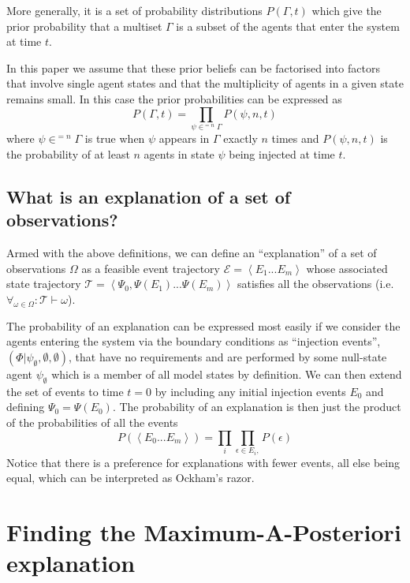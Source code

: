 \documentclass{article}
\begin{document}
More generally, it is a set of probability distributions $P(\Gamma,t)$ which give the prior probability that a multiset $\Gamma$ is a subset of the agents that enter the system at time $t$.

In this paper we assume that these prior beliefs can be factorised into factors that involve single agent states and that the multiplicity of agents in a given state remains small. In this case the prior probabilities can be expressed as
\[
P(\Gamma,t) = \prod_{\psi \in^{=n} \Gamma} P(\psi,n,t)
\]
where $\psi\in^{=n}\Gamma$ is true when $\psi$ appears in $\Gamma$ exactly $n$ times and $P(\psi,n,t)$ is the probability of at least $n$ agents in state $\psi$ being injected at time $t$. 


\subsection{What is an explanation of a set of observations?}

Armed with the above definitions, we can define an ``explanation'' of a set of observations $\Omega$ as a feasible event trajectory $\mathcal{E} = \left<E_1...E_m\right>$ whose associated state trajectory $\mathcal{T} = \left<\Psi_0, \Psi(E_1)...\Psi(E_m)\right>$ satisfies all the observations (i.e. $\forall_{\omega \in \Omega}: \mathcal{T} \vdash \omega$).

The probability of an explanation can be expressed most easily if we consider the agents entering the system via the boundary conditions as ``injection events'', $(\Phi|\psi_{\emptyset},\emptyset,\emptyset)$, that have no requirements and are performed by some null-state agent $\psi_\emptyset$ which is a member of all model states by definition. We can then extend the set of events to time $t=0$ by including any initial injection events $E_0$ and defining $\Psi_0 = \Psi(E_0)$. The probability of an explanation is then just the product of the probabilities of all the events
\[
P(\left<E_0...E_m\right>) = \prod_{i}\prod_{\epsilon\in E_i, }P(\epsilon)
\]
Notice that there is a preference for explanations with fewer events, all else being equal, which can be interpreted as Ockham's razor.

\section{Finding the Maximum-A-Posteriori explanation}
\end{document}
